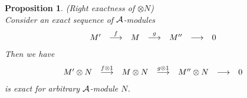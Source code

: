 \documentclass[11pt]{article}
\newtheorem{prop}[thm]{Proposition}
\newcommand{\cala}{{\cal A}}
\begin{document}
\begin{prop}(Right exactness of $\otimes N$)\\
Consider an exact sequence of $\cala$-modules
\begin{equation*}
\begin{array}{ c c c c c c c c c}
  M' & \overset{f}{\longrightarrow } & M & \overset{g}{\longrightarrow } & M'' & \longrightarrow  & 0\\
\end{array}
\end{equation*}
Then we have
\begin{equation*}
\begin{array}{ c c c c c c c c c}
  M'\otimes N & \overset{f\otimes 1}{\longrightarrow } & M\otimes N & \overset{g\otimes 1}{\longrightarrow } & M''\otimes N & \longrightarrow  & 0\\
\end{array}
\end{equation*}
 is  exact for arbitrary $\cala$-module $N$.
\end{prop}
\end{document}
